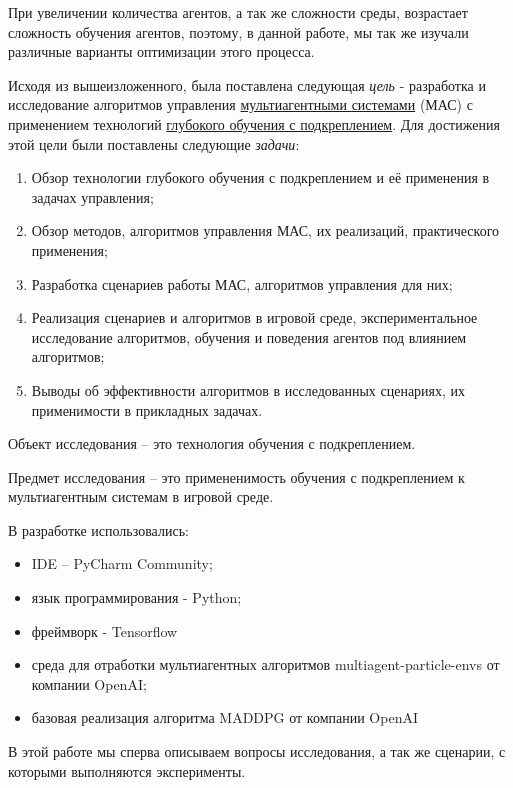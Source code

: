 При увеличении количества агентов, а так же сложности среды, возрастает сложность обучения агентов, поэтому, в данной работе, мы так же изучали различные варианты оптимизации этого процесса.

Исходя из вышеизложенного, была поставлена следующая \textit{цель} - разработка и исследование алгоритмов управления \hyperref[acr:rl]{мультиагентными системами} (МАС) с применением технологий \hyperref[acr:drl]{глубокого обучения с подкреплением}. Для достижения этой цели были поставлены следующие \textit{задачи}:

\begin{enumerate}
	\item Обзор технологии глубокого обучения с подкреплением и её применения в задачах управления;
	\item Обзор методов, алгоритмов управления МАС, их реализаций, практического применения;
	\item Разработка сценариев работы МАС, алгоритмов управления для них;
	\item Реализация сценариев и алгоритмов в игровой среде, экспериментальное исследование алгоритмов, обучения и поведения агентов под влиянием алгоритмов;
	\item Выводы об эффективности алгоритмов в исследованных сценариях, их применимости в прикладных задачах. 
\end{enumerate}

Объект исследования -- это технология обучения с подкреплением.

Предмет исследования -- это примененимость обучения с подкреплением к мультиагентным системам в игровой среде.

В разработке использовались:

\begin{itemize}
	\item IDE -- PyCharm Community;
	\item язык программирования - Python;
	\item фреймворк - Tensorflow
	\item среда для отработки мультиагентных алгоритмов multiagent-particle-envs \cite{multiagent-particle-envs} от компании OpenAI;
	\item базовая реализация алгоритма MADDPG \cite{lowe2017multiagent} от компании OpenAI
\end{itemize}

В этой работе мы сперва описываем вопросы исследования, а так же сценарии, с которыми выполняются эксперименты.

